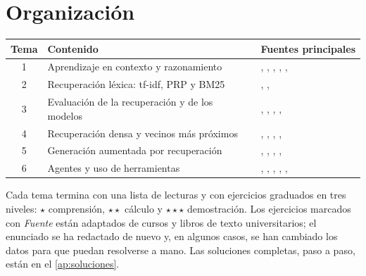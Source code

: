 \documentclass[11pt,a4paper,twoside,openany]{book}
\begin{document}
\section*{Organización}
\begin{center}\small
\begin{tabular}{@{}cll@{}}
\toprule
Tema & Contenido & Fuentes principales \\
\midrule
1 & Aprendizaje en contexto y razonamiento & \cite{brown}, \cite{olsson}, \cite{vonoswald}, \cite{wei-cot}, \cite{wang-sc}, \cite{cs224n} \\
2 & Recuperación léxica: tf-idf, PRP y BM25 & \cite{iir}, \cite{rz}, \cite{jm3} \\
3 & Evaluación de la recuperación y de los modelos & \cite{iir}, \cite{chen-codex}, \cite{brown}, \cite{zheng}, \cite{cs224n} \\
4 & Recuperación densa y vecinos más próximos & \cite{dpr}, \cite{jegou}, \cite{hnsw}, \cite{faiss}, \cite{jm3} \\
5 & Generación aumentada por recuperación & \cite{rag}, \cite{jm3}, \cite{cs224u}, \cite{cmu711}, \cite{liu-lost} \\
6 & Agentes y uso de herramientas & \cite{aima}, \cite{kaelbling}, \cite{react}, \cite{toolformer}, \cite{greshake}, \cite{cs294} \\
\bottomrule
\end{tabular}
\end{center}

Cada tema termina con una lista de lecturas y con ejercicios graduados en tres niveles: $\star$ comprensión, $\star\star$ cálculo y $\star\star\star$ demostración. Los ejercicios marcados con \emph{Fuente} están adaptados de cursos y libros de texto universitarios; el enunciado se ha redactado de nuevo y, en algunos casos, se han cambiado los datos para que puedan resolverse a mano. Las soluciones completas, paso a paso, están en el \cref{ap:soluciones}.
\end{document}
